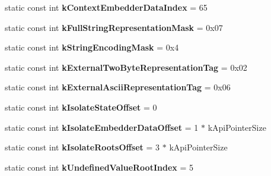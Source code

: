 \begin{DoxyCompactItemize}
\item 
\hypertarget{classv8_1_1internal_1_1_internals_afb65846499ec5f68172e4b2e8301a493}{}static const int {\bfseries k\+Context\+Embedder\+Data\+Index} = 65\label{classv8_1_1internal_1_1_internals_afb65846499ec5f68172e4b2e8301a493}

\item 
\hypertarget{classv8_1_1internal_1_1_internals_a5c39a86b30463928ea719def66916507}{}static const int {\bfseries k\+Full\+String\+Representation\+Mask} = 0x07\label{classv8_1_1internal_1_1_internals_a5c39a86b30463928ea719def66916507}

\item 
\hypertarget{classv8_1_1internal_1_1_internals_a1927ac3def13a57e03025e62ca46d1c5}{}static const int {\bfseries k\+String\+Encoding\+Mask} = 0x4\label{classv8_1_1internal_1_1_internals_a1927ac3def13a57e03025e62ca46d1c5}

\item 
\hypertarget{classv8_1_1internal_1_1_internals_a73faf917416d2519b65c7255e77a74ce}{}static const int {\bfseries k\+External\+Two\+Byte\+Representation\+Tag} = 0x02\label{classv8_1_1internal_1_1_internals_a73faf917416d2519b65c7255e77a74ce}

\item 
\hypertarget{classv8_1_1internal_1_1_internals_adea2f5a76d07821f7fa885a8dcda0eec}{}static const int {\bfseries k\+External\+Ascii\+Representation\+Tag} = 0x06\label{classv8_1_1internal_1_1_internals_adea2f5a76d07821f7fa885a8dcda0eec}

\item 
\hypertarget{classv8_1_1internal_1_1_internals_af591f991ecb24f9f6b33209e33b0d9ef}{}static const int {\bfseries k\+Isolate\+State\+Offset} = 0\label{classv8_1_1internal_1_1_internals_af591f991ecb24f9f6b33209e33b0d9ef}

\item 
\hypertarget{classv8_1_1internal_1_1_internals_ad722bf4760df09958cd1062db4a5524c}{}static const int {\bfseries k\+Isolate\+Embedder\+Data\+Offset} = 1 $\ast$ k\+Api\+Pointer\+Size\label{classv8_1_1internal_1_1_internals_ad722bf4760df09958cd1062db4a5524c}

\item 
\hypertarget{classv8_1_1internal_1_1_internals_a3142f942a25203ce7fca0e9a4563c74d}{}static const int {\bfseries k\+Isolate\+Roots\+Offset} = 3 $\ast$ k\+Api\+Pointer\+Size\label{classv8_1_1internal_1_1_internals_a3142f942a25203ce7fca0e9a4563c74d}

\item 
\hypertarget{classv8_1_1internal_1_1_internals_a7281ff0eafed559e64613465b1a03296}{}static const int {\bfseries k\+Undefined\+Value\+Root\+Index} = 5\label{classv8_1_1internal_1_1_internals_a7281ff0eafed559e64613465b1a03296}


\end{DoxyCompactItemize}
